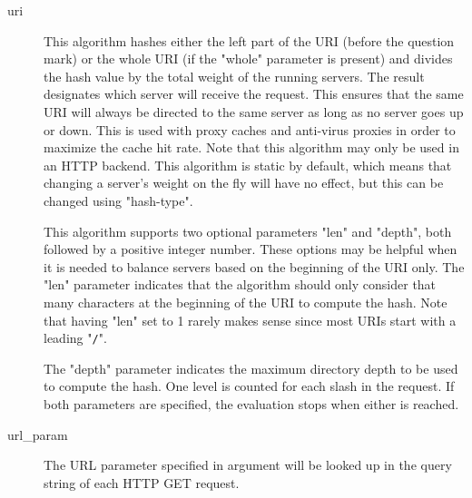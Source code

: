 \begin{description}
      \item[uri]         This algorithm hashes either the left part of the URI (before
                  the question mark) or the whole URI (if the "whole" parameter
                  is present) and divides the hash value by the total weight of
                  the running servers. The result designates which server will
                  receive the request. This ensures that the same URI will
                  always be directed to the same server as long as no server
                  goes up or down. This is used with proxy caches and
                  anti-virus proxies in order to maximize the cache hit rate.
                  Note that this algorithm may only be used in an HTTP backend.
                  This algorithm is static by default, which means that
                  changing a server's weight on the fly will have no effect,
                  but this can be changed using "hash-type".

                  This algorithm supports two optional parameters "len" and
                  "depth", both followed by a positive integer number. These
                  options may be helpful when it is needed to balance servers
                  based on the beginning of the URI only. The "len" parameter
                  indicates that the algorithm should only consider that many
                  characters at the beginning of the URI to compute the hash.
                  Note that having "len" set to 1 rarely makes sense since most
                  URIs start with a leading "\verb|/|".

                  The "depth" parameter indicates the maximum directory depth
                  to be used to compute the hash. One level is counted for each
                  slash in the request. If both parameters are specified, the
                  evaluation stops when either is reached.

      \item[url\_param]   The URL parameter specified in argument will be looked up in
                  the query string of each HTTP GET request.


\end{description}
